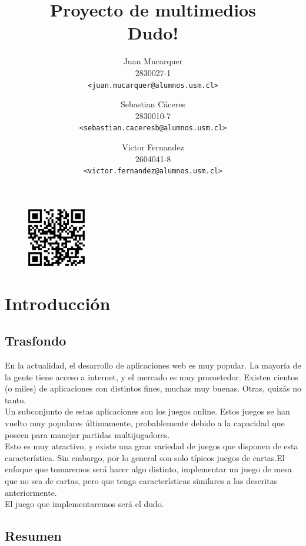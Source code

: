 \documentclass[a4paper,11pt]{article}
\title{Proyecto de multimedios\\Dudo!}
\author{Juan Mucarquer\\2830027-1\\\small{\texttt{<juan.mucarquer@alumnos.usm.cl>}} \and Sebastian Cáceres\\2830010-7\\\small{\texttt{<sebastian.caceresb@alumnos.usm.cl>}} \and Victor Fernandez\\2604041-8\\\small{\texttt{<victor.fernandez@alumnos.usm.cl>}}}
\begin{document}
%	
\maketitle
\begin{figure}
\includegraphics[width=1in]{qrcode.png}
\end{figure}

\newpage
\tableofcontents
\newpage

\section{Introducción}
\subsection{Trasfondo}
	En la actualidad, el desarrollo de aplicaciones web es muy popular. 
La mayoría de la gente tiene acceso a internet, y el mercado es muy prometedor.
Existen cientos (o miles) de aplicaciones con distintos fines, muchas muy 
buenas. Otras, quizás no tanto. \\

	Un subconjunto de estas aplicaciones son los juegos online. Estos 
juegos se han vuelto muy populares últimamente, probablemente debido a la
capacidad que poseen para manejar partidas multijugadores.\\

 Esto es muy atractivo, y existe una gran variedad de juegos que disponen 
de esta característica. Sin embargo, por lo general son solo típicos juegos 
de cartas.El enfoque que tomaremos será hacer algo distinto, implementar 
un juego de mesa que no sea de cartas, pero que tenga características 
similares a las descritas anteriormente. \\

El juego que implementaremos será el dudo.  
	

\subsection{Resumen}
\end{document}
